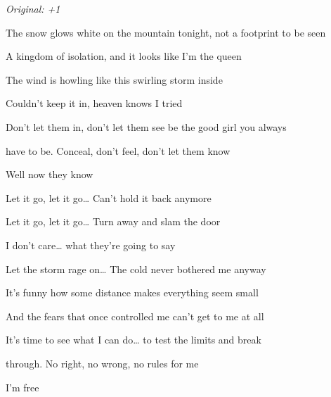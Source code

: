 \begin{song}


\begin{headerbox}
\textit{Original: +1}
\end{headerbox}

\begin{hchordbox}
\end{hchordbox}

\bigskip

The snow glows white on the mountain tonight, not a footprint to be seen  \par
A kingdom of isolation, and it looks like I'm the queen  \par
{} The wind is howling like this swirling storm inside \par
{} Couldn't keep it in, heaven knows I tried  \par

\bigskip

 Don't let them in, don't let them see be the good girl you always\par
have to be. Conceal, don't feel, don't let them know \par
Well now they know  \par

\bigskip

Let it go, let it go… Can't hold it back anymore \par
Let it go, let it go… Turn away and slam the door \par
{}I don't care… what they're going to say \par
Let the storm rage on… The cold never bothered me anyway \par

\bigskip

  \par
It's funny how some distance makes everything seem small \par
And the fears that once controlled me can't get to me at all \par
{} It's time to see what I can do… to test the limits and break \par
{}through. No right, no wrong, no rules for me \par
I'm free  \par


\end{song}
